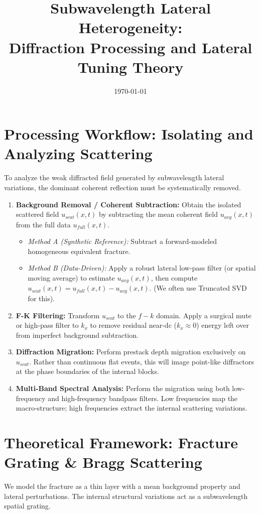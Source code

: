 \documentclass{article}
\title{Subwavelength Lateral Heterogeneity: \\ Diffraction Processing and Lateral Tuning Theory}
\author{}
\date{\today}
\begin{document}
\maketitle

\section{Processing Workflow: Isolating and Analyzing Scattering}
To analyze the weak diffracted field generated by subwavelength lateral variations, the dominant coherent reflection must be systematically removed.

\begin{enumerate}
    \item \textbf{Background Removal / Coherent Subtraction:} Obtain the isolated scattered field $u_{scat}(x,t)$ by subtracting the mean coherent field $u_{avg}(x,t)$ from the full data $u_{full}(x,t)$.
    \begin{itemize}
        \item \textit{Method A (Synthetic Reference):} Subtract a forward-modeled homogeneous equivalent fracture.
        \item \textit{Method B (Data-Driven):} Apply a robust lateral low-pass filter (or spatial moving average) to estimate $u_{avg}(x,t)$, then compute $u_{scat}(x,t) = u_{full}(x,t) - u_{avg}(x,t)$. (We often use Truncated SVD for this).
    \end{itemize}
    \item \textbf{F-K Filtering:} Transform $u_{scat}$ to the $f-k$ domain. Apply a surgical mute or high-pass filter to $k_x$ to remove residual near-dc ($k_x \approx 0$) energy left over from imperfect background subtraction.
    \item \textbf{Diffraction Migration:} Perform prestack depth migration exclusively on $u_{scat}$. Rather than continuous flat events, this will image point-like diffractors at the phase boundaries of the internal blocks.
    \item \textbf{Multi-Band Spectral Analysis:} Perform the migration using both low-frequency and high-frequency bandpass filters. Low frequencies map the macro-structure; high frequencies extract the internal scattering variations.
\end{enumerate}

\section{Theoretical Framework: Fracture Grating \& Bragg Scattering}
We model the fracture as a thin layer with a mean background property and lateral perturbations. The internal structural variations act as a subwavelength spatial grating.
\end{document}
